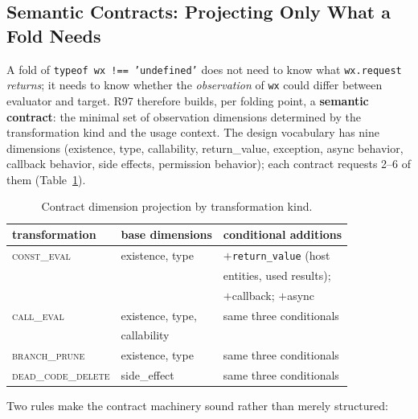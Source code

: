 \documentclass[sigconf,nonacm]{acmart}
\begin{document}
\subsection{Semantic Contracts: Projecting Only What a Fold Needs}\label{sec:contract}

A fold of \texttt{typeof wx !== 'undefined'} does not need to know what \texttt{wx.request} \emph{returns}; it needs to know whether the \emph{observation} of \texttt{wx} could differ between evaluator and target. R97 therefore builds, per folding point, a \textbf{semantic contract}: the minimal set of observation dimensions determined by the transformation kind and the usage context. The design vocabulary has nine dimensions (existence, type, callability, return\_value, exception, async behavior, callback behavior, side effects, permission behavior); each contract requests 2--6 of them (Table~\ref{tab:contract}).

\begin{table}[t]
  \centering
  \caption{Contract dimension projection by transformation kind.}
  \label{tab:contract}
  \small
  \begin{tabular}{lll}
    \toprule
    transformation & base dimensions & conditional additions \\
    \midrule
    \textsc{const\_eval} & existence, type & $+$\texttt{return\_value} (host \\
    & & entities, used results); \\
    & & $+$callback; $+$async \\
    \textsc{call\_eval} & existence, type, & same three conditionals \\
    & callability & \\
    \textsc{branch\_prune} & existence, type & same three conditionals \\
    \textsc{dead\_code\_delete} & side\_effect & same three conditionals \\
    \bottomrule
  \end{tabular}
\end{table}

Two rules make the contract machinery sound rather than merely structured:
\end{document}
